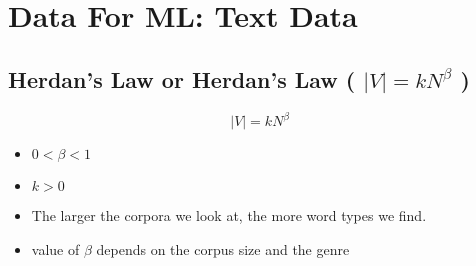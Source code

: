 \chapter{Data For ML: Text Data}

\section{Herdan’s Law or Herdan’s Law ( $|V| = kN^{\beta}$ ) \cite{nlp-1}}

\begin{equation}
    |V| = kN^{\beta}
\end{equation}

\begin{itemize}
    \item $0 < \beta < 1$ 
    \item $k > 0$
    \item The larger the corpora we look at, the more word types we find.
    \item value of $\beta$ depends on the corpus size and the genre
\end{itemize}












































